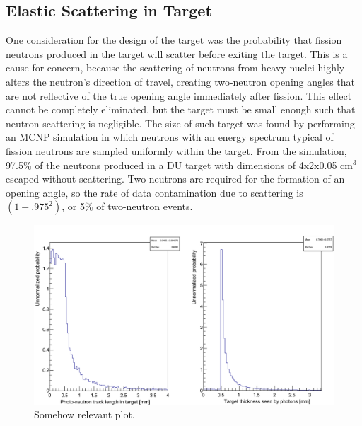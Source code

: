 \subsection{Elastic Scattering in Target}
One consideration for the design of the target was the probability that fission neutrons produced in the target will scatter before exiting the target.
This is a cause for concern, because the scattering of neutrons from heavy nuclei highly alters the neutron's direction of travel, creating two-neutron opening angles that are not reflective of the true opening angle immediately after fission.
This effect cannot be completely eliminated, but the target must be small enough such that neutron scattering is negligible.
The size of such target was found by performing an MCNP simulation in which neutrons with an energy spectrum typical of fission neutrons are sampled uniformly within the target.
From the simulation, 97.5\% of the neutrons produced in a DU target with dimensions of 4x2x0.05 $\text{cm}^3$ escaped without scattering.
Two neutrons are required for the formation of an opening angle, so the rate of data contamination due to scattering is $(1-.975^2)$, or 5\% of two-neutron events.
\begin{figure}
    \centering
    \includegraphics[width = \textwidth]{Content/Errors/ScatteringInTarget.png}
    \caption{Somehow relevant plot.}
    \label{fig:ScatteringInTarget}
\end{figure}
